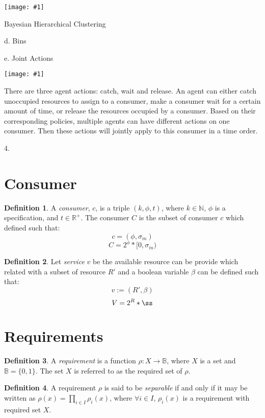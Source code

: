 \documentclass{article}
\theoremstyle{definition}
\newtheorem{definition}{Definition}[section]
\theoremstyle{remark}
\newcommand{\reqfunc}[2]{#1:#2\rightarrow\mathbb{B}}
\newcommand{\addpic}[1]{\texttt{[image: \#1]}}
\begin{document}
	\addpic{figures/Policy-Generator.png}
	
	Bayesian Hierarchical Clustering
	
	d. Bins
	
	e. Joint Actions
	

	\addpic{figures/Joint-action.jpg}



	
	There are three agent actions: catch, wait and release. An agent can either catch unoccupied resources to assign to a consumer, make a consumer wait for a certain amount of time, or release the resources occupied by a consumer. Based on their corresponding policies, multiple agents can have different actions on one consumer. Then these actions will jointly apply to this consumer in a time order.
		
	4.
	
	
	\section{Consumer}
	
		\begin{definition}
			A \emph{consumer}, $c$, is a triple $(k, \phi, t)$, where $k \in \mathbb{N}$, $\phi$ is a specification, and $t \in \mathbb{R}^{+}$. The consumer $C$ is the subset of consumer $c$ which defined such that:
			\[
			c = (\phi , \sigma_m)
			\]
			\[
			C = 2^{\phi}*[0,\sigma_m)
			\]
		\end{definition}
		
		\begin{definition}
			Let \emph{service} $v$ be the available resource can be provide which related with a subset of resource $R'$ and a boolean variable $\beta$ can be defined such that:
			\[
			v := (R', \beta)
			\]
			\[
			V = 2^{R}*{\ss}
			\]
		\end{definition}
	
	\section{Requirements}
	
		\begin{definition}
			A \emph{requirement} is a function $\reqfunc{\rho}{X}$, where $X$ is a set and $\mathbb{B} = \{0,1\}$. The set $X$ is referred to as the required set of $\rho$.
		\end{definition}
		
		\begin{definition}
			A requirement $\rho$ is said to be \emph{separable} if and only if it may be written as $\rho(x) = \prod_{i \in I}{\rho_{i}(x)}$, where $\forall i \in I$, $\rho_{i}(x)$ is a requirement with required set $X$.
		\end{definition}
		
\end{document}

